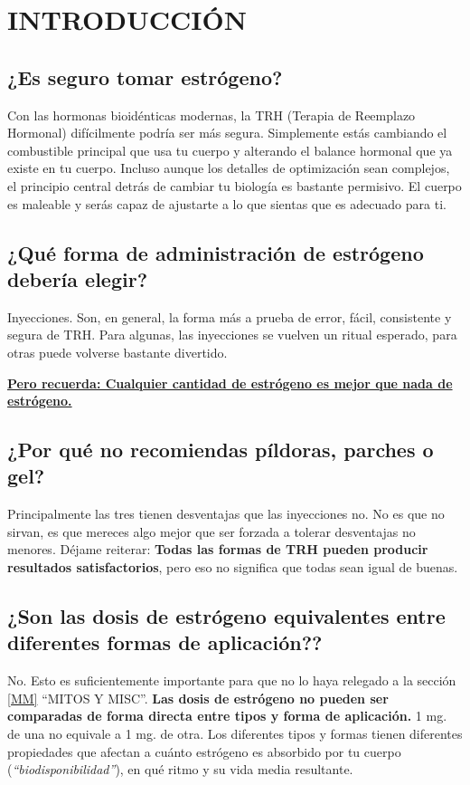 \documentclass{article}
\begin{document}
\section{INTRODUCCIÓN}

\subsection{¿Es seguro tomar estrógeno?}

Con las hormonas bioidénticas modernas, la TRH (Terapia de Reemplazo Hormonal) difícilmente podría ser más segura. Simplemente estás cambiando el combustible principal que usa tu cuerpo y alterando el balance hormonal que ya existe en tu cuerpo. Incluso aunque los detalles de optimización sean complejos, el principio central detrás de cambiar tu biología es bastante permisivo. El cuerpo es maleable y serás capaz de ajustarte a lo que sientas que es adecuado para ti.

\subsection{¿Qué forma de administración de estrógeno debería elegir?}

Inyecciones. Son, en general, la forma más a prueba de error, fácil, consistente y segura de TRH. Para algunas, las inyecciones se vuelven un ritual esperado, para otras puede volverse bastante divertido.

\noindent\underline{\textbf{Pero recuerda: Cualquier cantidad de estrógeno es mejor que nada de estrógeno.}}

\subsection{¿Por qué no recomiendas píldoras, parches o gel?}

Principalmente las tres tienen desventajas que las inyecciones no. No es que no sirvan, es que mereces algo mejor que ser forzada a tolerar desventajas no menores. Déjame reiterar: \textbf{Todas las formas de TRH pueden producir resultados satisfactorios}, pero eso no significa que todas sean igual de buenas.

\subsection{¿Son las dosis de estrógeno equivalentes entre diferentes formas de aplicación??}

No. Esto es suficientemente importante para que no lo haya relegado a la sección \ref{MM} “MITOS Y MISC”. \textbf{Las dosis de estrógeno no pueden ser comparadas de forma directa entre tipos y forma de aplicación.} 1 mg. de una no equivale a 1 mg. de otra. Los diferentes tipos y formas tienen diferentes propiedades que afectan a cuánto estrógeno es absorbido por tu cuerpo (\textit{“biodisponibilidad”}), en qué ritmo y su vida media resultante.
\end{document}
